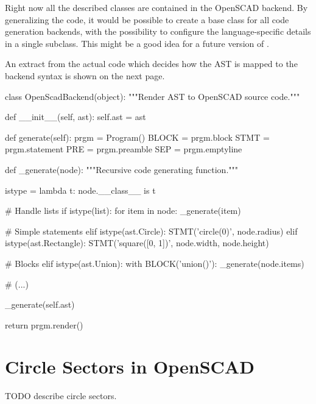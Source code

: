 Right now all the described classes are contained in the OpenSCAD backend. By
generalizing the code, it would be possible to create a base class for all code
generation backends, with the possibility to configure the language-specific
details in a single subclass. This might be a good idea for a future version of
\tangible{}.

An extract from the actual code which decides how the AST is mapped to the
backend syntax is shown on the next page.

\vspace{.5\baselineskip}
\begin{pythoncode}
class OpenScadBackend(object):
    """Render AST to OpenSCAD source code."""

    def __init__(self, ast):
        self.ast = ast

    def generate(self):
        prgm = Program()
        BLOCK = prgm.block
        STMT = prgm.statement
        PRE = prgm.preamble
        SEP = prgm.emptyline

        def _generate(node):
            """Recursive code generating function."""

            istype = lambda t: node.__class__ is t

            # Handle lists
            if istype(list):
                for item in node:
                    _generate(item)

            # Simple statements
            elif istype(ast.Circle):
                STMT('circle({0})', node.radius)
            elif istype(ast.Rectangle):
                STMT('square([{0}, {1}])', node.width, node.height)

            # Blocks
            elif istype(ast.Union):
                with BLOCK('union()'):
                    _generate(node.items)

            # (...)

        _generate(self.ast)

        return prgm.render()
\end{pythoncode}



\newpage
\section{Circle Sectors in OpenSCAD}\label{sec:design:circlesectors}

TODO describe circle sectors.
